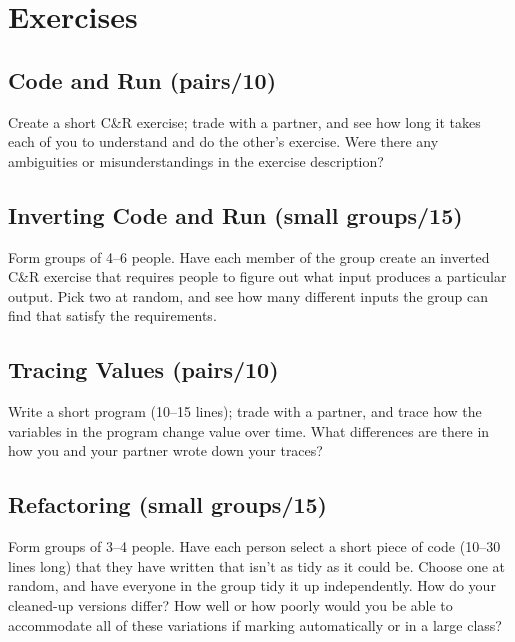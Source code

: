 \section{Exercises}\label{s:exercises-exercises}

\subsection{Code and Run (pairs/10)}\label{code-and-run-pairs10}

Create a short C\&R exercise; trade with a partner, and see how long it
takes each of you to understand and do the other's exercise. Were there
any ambiguities or misunderstandings in the exercise description?

\subsection{Inverting Code and Run (small groups/15)}\label{inverting-code-and-run-small-groups15}

Form groups of 4--6 people. Have each member of the group create an
inverted C\&R exercise that requires people to figure out what input
produces a particular output. Pick two at random, and see how many
different inputs the group can find that satisfy the requirements.

\subsection{Tracing Values (pairs/10)}\label{tracing-values-pairs10}

Write a short program (10--15 lines); trade with a partner, and trace how
the variables in the program change value over time. What differences
are there in how you and your partner wrote down your traces?

\subsection{Refactoring (small groups/15)}\label{refactoring-small-groups15}

Form groups of 3--4 people. Have each person select a short piece of code
(10--30 lines long) that they have written that isn't as tidy as it could
be. Choose one at random, and have everyone in the group tidy it up
independently. How do your cleaned-up versions differ? How well or how
poorly would you be able to accommodate all of these variations if
marking automatically or in a large class?

